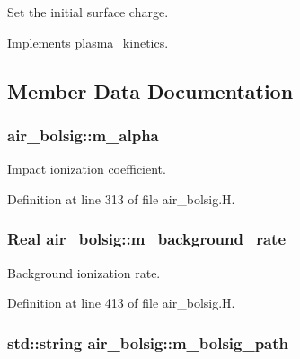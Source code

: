 Set the initial surface charge. 



Implements \hyperlink{classplasma__kinetics_ab84256b4cef8d2d6adbb3b7f0e3c6916}{plasma\+\_\+kinetics}.



\subsection{Member Data Documentation}
\subsubsection[{\texorpdfstring{m\+\_\+alpha}{m_alpha}}]{ air\+\_\+bolsig\+::m\+\_\+alpha\hspace{0.3cm}{\ttfamily [protected]}}\hypertarget{classair__bolsig_a0eaef65d6cadae8030e9efae37b37081}{}\label{classair__bolsig_a0eaef65d6cadae8030e9efae37b37081}


Impact ionization coefficient. 



Definition at line 313 of file air\+\_\+bolsig.\+H.

\subsubsection[{\texorpdfstring{m\+\_\+background\+\_\+rate}{m_background_rate}}]{\setlength{\rightskip}{0pt plus 5cm}Real air\+\_\+bolsig\+::m\+\_\+background\+\_\+rate\hspace{0.3cm}{\ttfamily [protected]}}\hypertarget{classair__bolsig_a3d872a5d86ec4be2f5e962adceb622da}{}\label{classair__bolsig_a3d872a5d86ec4be2f5e962adceb622da}


Background ionization rate. 



Definition at line 413 of file air\+\_\+bolsig.\+H.

\subsubsection[{\texorpdfstring{m\+\_\+bolsig\+\_\+path}{m_bolsig_path}}]{\setlength{\rightskip}{0pt plus 5cm}std\+::string air\+\_\+bolsig\+::m\+\_\+bolsig\+\_\+path\hspace{0.3cm}{\ttfamily [protected]}}\hypertarget{classair__bolsig_afe5060d9010503047c6d343384f66d8f}{}\label{classair__bolsig_afe5060d9010503047c6d343384f66d8f}


